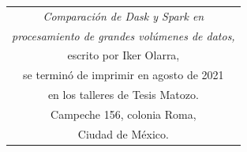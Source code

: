 \documentclass[11pt, oneside]{book}
\begin{document}
\newpage
\thispagestyle{empty}
\begin{table}[p]
\centering
\small
\label{ed}
\begin{tabular}{c}
\textit{Comparación de Dask y Spark en} \\ \textit{procesamiento de grandes volúmenes de datos,}\\ escrito por Iker Olarra,\\ se terminó de imprimir en agosto de 2021\\ en los talleres de Tesis Matozo.\\ Campeche 156, colonia Roma,\\ Ciudad de México.
\end{tabular}
\end{table}


\end{document}
